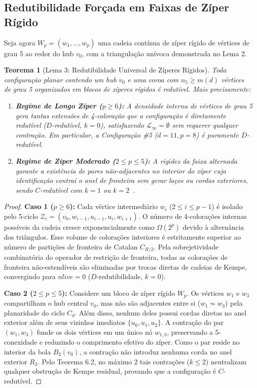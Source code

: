 \documentclass[11pt,a4paper]{article}
\theoremstyle{plain}
\newtheorem{theorem}{Teorema}[section]
\theoremstyle{definition}
\begin{document}
\subsection{Redutibilidade Forçada em Faixas de Zíper Rígido}

Seja agora $W_p = (w_1, \dots, w_p)$ uma cadeia contínua de zíper rígido de vértices de grau 5 ao redor do hub $v_0$, com a triangulação unívoca demonstrada no Lema 2.

\begin{theorem}[Lema 3: Redutibilidade Universal de Zíperes Rígidos]
Toda configuração planar contendo um hub $v_0$ e uma coroa com $n_5 \ge m(d)$ vértices de grau 5 organizados em blocos de zíperes rígidos é redutível. Mais precisamente:
\begin{enumerate}
    \item \textbf{Regime de Longo Zíper ($p \ge 6$):} A densidade interna de vértices de grau 5 gera tantas extensões de 4-coloração que a configuração é diretamente redutível ($D$-redutível, $k = 0$), satisfazendo $\mathcal{L}_\infty = \emptyset$ sem requerer qualquer contração. Em particular, a Configuração \#5 ($d=11, p=8$) é puramente $D$-redutível.
    \item \textbf{Regime de Zíper Moderado ($2 \le p \le 5$):} A rigidez da faixa alternada garante a existência de pares não-adjacentes no interior do zíper cuja identificação contrai o anel de fronteira sem gerar laços ou cordas exteriores, sendo $C$-redutível com $k=1$ ou $k=2$~\cite{stromquist1975some}.
\end{enumerate}
\end{theorem}

\begin{proof}
\textbf{Caso 1 ($p \ge 6$):} Cada vértice intermediário $w_i$ ($2 \le i \le p-1$) é isolado pelo 5-ciclo $\mathcal{Z}_i = (v_0, w_{i-1}, u_{i-1}, u_i, w_{i+1})$. 
O número de 4-colorações internas possíveis da cadeia cresce exponencialmente como $\Omega(2^p)$ devido à alternância dos triângulos. Esse volume de colorações interiores é estritamente superior ao número de partições de fronteira de Catalan $C_{R/2}$. Pela sobrejetividade combinatória do operador de restrição de fronteira, todas as colorações de fronteira não-estendíveis são eliminadas por trocas diretas de cadeias de Kempe, convergindo para $nlive = 0$ ($D$-redutibilidade, $k=0$).

\textbf{Caso 2 ($2 \le p \le 5$):} Considere um bloco de zíper rígido $W_p$. Os vértices $w_1$ e $w_3$ compartilham o hub central $v_0$, mas não são adjacentes entre si ($w_1 \nsim w_3$) pela planaridade do ciclo $C_d$. Além disso, nenhum deles possui cordas diretas no anel exterior além de seus vizinhos imediatos $\{u_0, u_1, u_2\}$. 
A contração do par $(w_1, w_3)$ funde os dois vértices em um único nó $w_{1,3}$, preservando a 5-conexidade e reduzindo o comprimento efetivo do zíper. Como o par reside no interior da bola $B_2(v_0)$, a contração não introduz nenhuma corda no anel exterior $R_2$. Pelo Teorema 6.2, no máximo 2 tais contrações ($k \le 2$) neutralizam qualquer obstrução de Kempe residual, provando que a configuração é $C$-redutível.
\end{proof}
\end{document}
